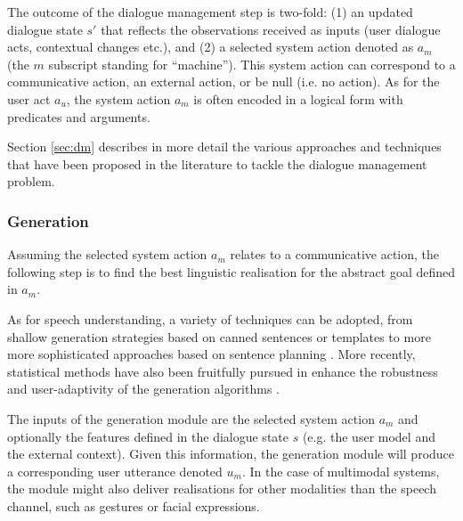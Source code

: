 The outcome of the dialogue management step is two-fold: (1) an updated dialogue state $s'$ that reflects the observations received as inputs (user dialogue acts, contextual changes etc.), and (2) a selected system action denoted as $a_m$ (the $m$ subscript standing for ``machine'').  This system action can correspond to a communicative action, an external action, or be null (i.e. no action).  As for the user act $a_u$, the system action $a_m$ is often encoded in a logical form with predicates and arguments. 

Section \ref{sec:dm} describes in more detail the various approaches and techniques that have been proposed in the literature to tackle the dialogue management problem. 

\subsubsection*{Generation}
Assuming the selected system action $a_m$ relates to a communicative action, the following step is to find the best linguistic realisation for the abstract goal defined in $a_m$.  


As for speech understanding, a variety of techniques can be adopted, from shallow generation strategies based on canned sentences or templates to more more sophisticated approaches based on sentence planning \citep{Stone2003,koller-stone:2007}.  More recently, statistical methods have also been fruitfully pursued in enhance the robustness and user-adaptivity of the generation algorithms \citep{Rieser:2010,DethlefsC11}. 

The inputs of the generation module are the selected system action $a_m$ and optionally the features defined in the dialogue state $s$ (e.g. the user model and the external context). Given this information, the generation module will produce a corresponding user utterance denoted $u_m$.  In the case of multimodal systems, the module might also deliver realisations for other modalities than the speech channel, such as gestures or facial expressions.


